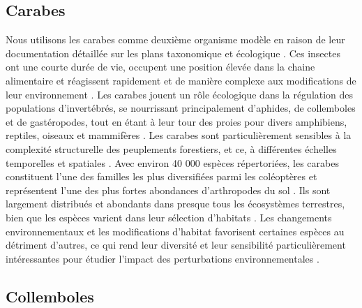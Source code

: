 \subsection*{Carabes}

Nous utilisons les carabes comme deuxième organisme modèle en raison de leur documentation détaillée sur les plans taxonomique et écologique \citep{loveiEcologyBehaviorGround1996}. 
Ces insectes ont une courte durée de vie, occupent une position élevée dans la chaine alimentaire et réagissent rapidement et de manière complexe aux modifications de leur environnement \citep{loveiEcologyBehaviorGround1996}.
Les carabes jouent un rôle écologique dans la régulation des populations d'invertébrés, se nourrissant principalement d'aphides, de collemboles et de gastéropodes, tout en étant à leur tour des proies pour divers amphibiens, reptiles, oiseaux et mammifères \citep{loveiEcologyBehaviorGround1996}. 
Les carabes sont particulièrement sensibles à la complexité structurelle des peuplements forestiers, et ce, à différentes échelles temporelles et spatiales \citep{Butterfield1995Carabidbeetle,loveiEcologyBehaviorGround1996,Niemela2007effectsforestry}.
Avec environ 40 000 espèces répertoriées, les carabes constituent l'une des familles les plus diversifiées parmi les coléoptères et représentent l'une des plus fortes abondances d'arthropodes du sol \citep{Erwin1985taxonpulse,loveiEcologyBehaviorGround1996,Rochefort2006GroundBeetle}. 
Ils sont largement distribués et abondants dans presque tous les écosystèmes terrestres, bien que les espèces varient dans leur sélection d'habitats \citep{loveiEcologyBehaviorGround1996,kotzeFortyYearsCarabid2011a,Larochelle2003naturalhistory}. 
Les changements environnementaux et les modifications d'habitat favorisent certaines espèces au détriment d'autres, ce qui rend leur diversité et leur sensibilité particulièrement intéressantes pour étudier l'impact des perturbations environnementales \citep{Rainio2003Groundbeetles}.

\subsection*{Collemboles}

